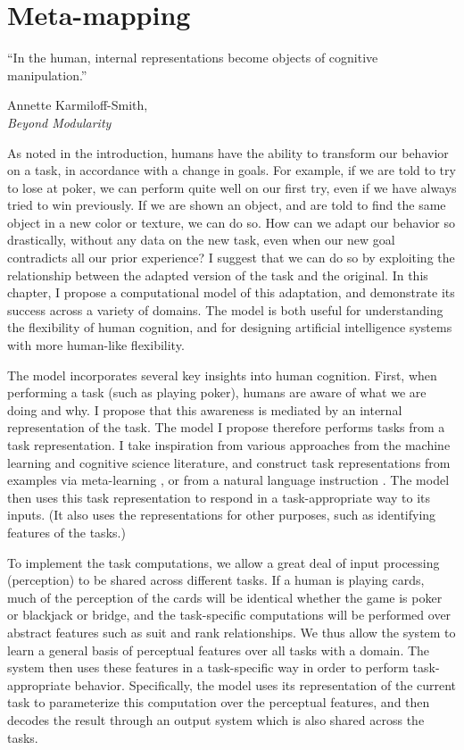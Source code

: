 \chapter{Meta-mapping} \label{chapter:zero_shot_via_homm}
\epigraph{``In the human, internal representations become objects of cognitive manipulation.''}{Annette Karmiloff-Smith,\\\textit{Beyond Modularity}}


As noted in the introduction, humans have the ability to transform our behavior on a task, in accordance with a change in goals. For example, if we are told to try to lose at poker, we can perform quite well on our first try, even if we have always tried to win previously. If we are shown an object, and are told to find the same object in a new color or texture, we can do so. How can we adapt our behavior so drastically, without any data on the new task, even when our new goal contradicts all our prior experience? I suggest that we can do so by exploiting the relationship between the adapted version of the task and the original. In this chapter, I propose a computational model of this adaptation, and demonstrate its success across a variety of domains. The model is both useful for understanding the flexibility of human cognition, and for designing artificial intelligence systems with more human-like flexibility.   

The model incorporates several key insights into human cognition. First, when performing a task (such as playing poker), humans are aware of what we are doing and why. I propose that this awareness is mediated by an internal representation of the task. The model I propose therefore performs tasks from a task representation. I take inspiration from various approaches from the machine learning and cognitive science literature, and construct task representations from examples via meta-learning \citep[e.g.][]{Vinyals2016, Santoro2016, Finn2017a, Finn2018, Stadie2018, Botvinick2019}, or from a natural language instruction \citep{Larochelle2008, Hermann2017, Hill2019a}. The model then uses this task representation to respond in a task-appropriate way to its inputs. (It also uses the representations for other purposes, such as identifying features of the tasks.) 

To implement the task computations, we allow a great deal of input processing (perception) to be shared across different tasks. If a human is playing cards, much of the perception of the cards will be identical whether the game is poker or blackjack or bridge, and the task-specific computations will be performed over abstract features such as suit and rank relationships. We thus allow the system to learn a general basis of perceptual features over all tasks with a domain. The system then uses these features in a task-specific way in order to perform task-appropriate behavior. Specifically, the model uses its representation of the current task to parameterize this computation over the perceptual features, and then decodes the result through an output system which is also shared across the tasks. 

